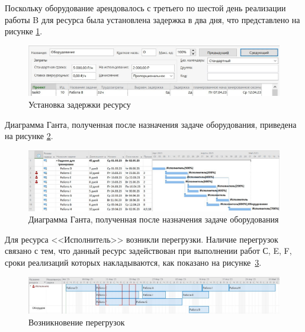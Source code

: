 Поскольку оборудование арендовалось с третьего по шестой день реализации работы B для ресурса была установлена задержка в два дня, что представлено на рисунке \ref{img:task0-delay}.

\begin{figure}[H]
	\begin{center}
		\includegraphics[scale=0.45]{inc/img/task0-delay.jpg}
	\end{center}
	\captionsetup{justification=centering}
	\caption{Установка задержки ресурсу}
	\label{img:task0-delay}
\end{figure}

Диаграмма Ганта, полученная после назначения задаче оборудования, приведена на рисунке \ref{img:task0-diagram2}.

\begin{figure}[H]
	\begin{center}
		\includegraphics[scale=0.48]{inc/img/task0-diagram2.jpg}
	\end{center}
	\captionsetup{justification=centering}
	\caption{Диаграмма Ганта, полученная после назначения задаче оборудования}
	\label{img:task0-diagram2}
\end{figure}

Для ресурса <<Исполнитель>> возникли перегрузки. Наличие перегрузок связано с тем, что данный ресурс задействован при выполнении работ С, E, F, сроки реализаций которых накладываются, как показано на рисунке~\ref{img:task0-overload}.

\begin{figure}[H]
	\begin{center}
		\includegraphics[scale=0.45]{inc/img/task0-overload.jpg}
	\end{center}
	\captionsetup{justification=centering}
	\caption{Возникновение перегрузок}
	\label{img:task0-overload}
\end{figure}

